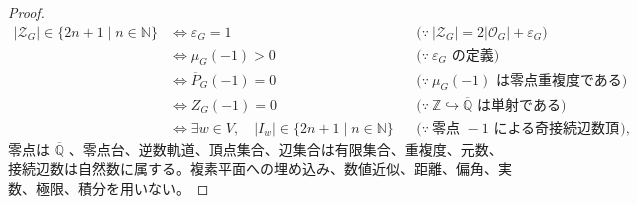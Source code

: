 \documentclass[11pt,a4paper]{article}
\theoremstyle{remark}
\begin{document}
\begin{proof}
\[\begin{aligned}
|\mathcal Z_G|\in\{2n+1\mid n\in\mathbb N\}
&\Longleftrightarrow\varepsilon_G=1
&&\bigl(\because\ |\mathcal Z_G|=2|\mathcal O_G|+\varepsilon_G\bigr)\\
&\Longleftrightarrow\mu_G(-1)>0
&&\bigl(\because\ \varepsilon_G\text{ の定義}\bigr)\\
&\Longleftrightarrow\overline P_G(-1)=0
&&\bigl(\because\ \mu_G(-1)\text{ は零点重複度である}\bigr)\\
&\Longleftrightarrow Z_G(-1)=0
&&\bigl(\because\ \mathbb Z\hookrightarrow\overline{\mathbb Q}\text{ は単射である}\bigr)\\
&\Longleftrightarrow\exists w\in V,\quad |I_w|\in\{2n+1\mid n\in\mathbb N\}
&&\bigl(\because\ \text{零点 }-1\text{ による奇接続辺数頂点の特徴付け}\bigr),
\end{aligned}\]
零点は 
$\overline{\mathbb Q}$
、零点台、逆数軌道、頂点集合、辺集合は有限集合、重複度、元数、接続辺数は自然数に属する。複素平面への埋め込み、数値近似、距離、偏角、実数、極限、積分を用いない。

\end{proof}
\end{document}

